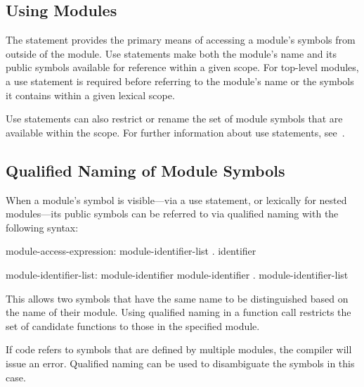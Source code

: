 \subsection{Using Modules}
\label{Using_Modules}

The  statement provides the primary means of accessing a
module's symbols from outside of the module.  Use statements make both
the module's name and its public symbols available for reference
within a given scope.  For top-level modules, a use statement is
required before referring to the module's name or the symbols it
contains within a given lexical scope.

Use statements can also restrict or rename the set of module symbols
that are available within the scope.  For further information about
use statements, see~.


\subsection{Qualified Naming of Module Symbols}
\label{Explicit_Naming}

When a module's symbol is visible---via a use statement, or lexically
for nested modules---its public symbols can be referred to via
qualified naming with the following syntax:
\begin{syntax}
module-access-expression:
  module-identifier-list . identifier

module-identifier-list:
  module-identifier
  module-identifier . module-identifier-list

\end{syntax}
This allows two symbols that have the same name to be distinguished
based on the name of their module.  Using qualified naming in a
function call restricts the set of candidate functions to those in the
specified module.

If code refers to symbols that are defined by multiple modules, the
compiler will issue an error.  Qualified naming can be used to
disambiguate the symbols in this case.

